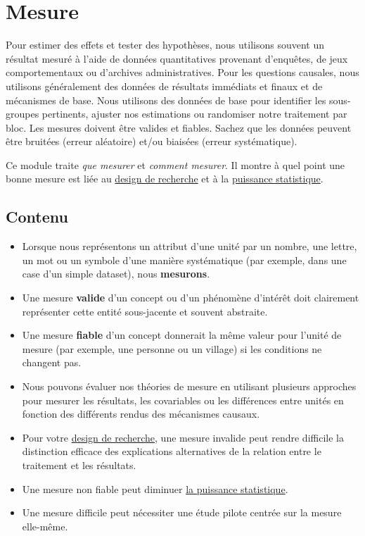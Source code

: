 \documentclass[
  12pt,
]{book}
\begin{document}
\hypertarget{mesure}{%
\chapter{Mesure}\label{mesure}}

Pour estimer des effets et tester des hypothèses, nous utilisons souvent un résultat mesuré à l'aide de données quantitatives provenant d'enquêtes, de jeux comportementaux ou d'archives administratives. Pour les questions causales, nous utilisons généralement des données de résultats immédiats et finaux et de mécanismes de base. Nous utilisons des données de base pour identifier les sous-groupes pertinents, ajuster nos estimations ou randomiser notre traitement par bloc. Les mesures doivent être valides et fiables. Sachez que les données peuvent être bruitées (erreur aléatoire) et/ou biaisées (erreur systématique).

Ce module traite \emph{que mesurer} et \emph{comment mesurer}. Il montre à quel point une bonne mesure est liée au \href{https://egap.github.io/learningdays-resources/Exercises/design-form.Rmd}{design de recherche} et à la \href{statistical-power-and-design-diagnosands.html}{puissance statistique}.

\hypertarget{contenu-6}{%
\section{Contenu}\label{contenu-6}}

\begin{itemize}
\item
  Lorsque nous représentons un attribut d'une unité par un nombre, une lettre, un mot ou un symbole d'une manière systématique (par exemple, dans une case d'un simple dataset), nous \textbf{mesurons}.
\item
  Une mesure \textbf{valide} d'un concept ou d'un phénomène d'intérêt doit clairement représenter cette entité sous-jacente et souvent abstraite.
\item
  Une mesure \textbf{fiable} d'un concept donnerait la même valeur pour l'unité de mesure (par exemple, une personne ou un village) si les conditions ne changent pas.
\item
  Nous pouvons évaluer nos théories de mesure en utilisant plusieurs approches pour mesurer les résultats, les covariables ou les différences entre unités en fonction des différents rendus des mécanismes causaux.
\item
  Pour votre \href{https://egap.github.io/learningdays-resources/Exercises/design-form.Rmd}{design de recherche}, une mesure invalide peut rendre difficile la distinction efficace des explications alternatives de la relation entre le traitement et les résultats.
\item
  Une mesure non fiable peut diminuer \href{statistical-power-and-design-diagnosands.html}{la puissance statistique}.
\item
  Une mesure difficile peut nécessiter une étude pilote centrée sur la mesure elle-même.
\end{itemize}
\end{document}
